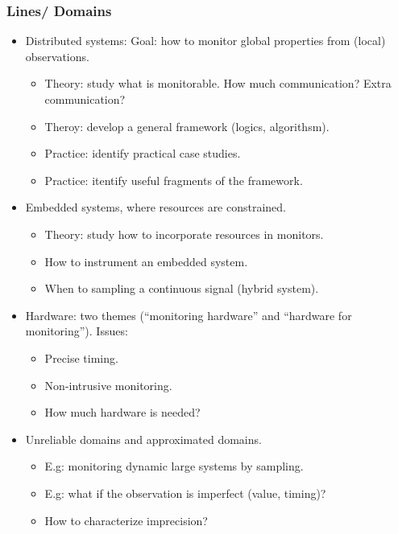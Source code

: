 \documentclass{beamer}
\begin{document}
\begin{frame}
  \frametitle{Lines/ Domains}

  \begin{itemize}
  \item \alert{Distributed systems}: 
    Goal: how to monitor global properties from (local) observations. 
    \begin{itemize} 
    \item Theory: study what is monitorable. How much communication?
      Extra communication?
    \item Theroy: develop a general framework (logics, algorithsm).
    \item Practice: identify practical case studies.
    \item Practice: itentify useful fragments of the framework.
    \end{itemize}
  \item \alert{Embedded systems}, where resources are constrained.
    \begin{itemize} 
    \item Theory: study how to incorporate resources in monitors.
    \item How to instrument an embedded system.
    \item When to sampling a continuous signal (hybrid system).
    \end{itemize}
  \item \alert{Hardware}: two themes (``monitoring hardware'' and ``hardware
    for monitoring''). Issues:
    \begin{itemize}
    \item Precise timing.
    \item Non-intrusive monitoring.
    \item How much hardware is needed?
    \end{itemize}
  \item \alert{Unreliable} domains and \alert{approximated} domains.
    \begin{itemize}
      \item E.g: monitoring dynamic large systems by sampling.
      \item E.g: what if the observation is imperfect (value, timing)?
      \item How to characterize imprecision?
    \end{itemize}
  \end{itemize}
\end{frame}
\end{document}
